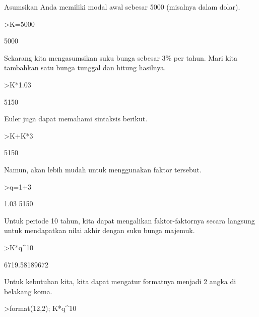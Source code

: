 \documentclass{article}
\newenvironment{eulernotebook}{\par}{\par}
\newenvironment{eulercomment}{\par\medskip}{\par\medskip}
\begin{document}
\begin{eulernotebook}
\begin{eulercomment}
\begin{eulercomment}
\begin{eulercomment}
\begin{eulercomment}
\begin{eulercomment}
\begin{eulercomment}
\begin{eulercomment}
\begin{eulercomment}
\begin{eulercomment}
Asumsikan Anda memiliki modal awal sebesar 5000 (misalnya dalam
dolar).
\end{eulercomment}
\begin{eulerprompt}
>K=5000
\end{eulerprompt}
\begin{euleroutput}
  5000
\end{euleroutput}
\begin{eulercomment}
Sekarang kita mengasumsikan suku bunga sebesar 3\% per tahun. Mari kita
tambahkan satu bunga tunggal dan hitung hasilnya.
\end{eulercomment}
\begin{eulerprompt}
>K*1.03
\end{eulerprompt}
\begin{euleroutput}
  5150
\end{euleroutput}
\begin{eulercomment}
Euler juga dapat memahami sintaksis berikut.
\end{eulercomment}
\begin{eulerprompt}
>K+K*3%
\end{eulerprompt}
\begin{euleroutput}
  5150
\end{euleroutput}
\begin{eulercomment}
Namun, akan lebih mudah untuk menggunakan faktor tersebut.
\end{eulercomment}
\begin{eulerprompt}
>q=1+3%
\end{eulerprompt}
\begin{euleroutput}
  1.03
  5150
\end{euleroutput}
\begin{eulercomment}
Untuk periode 10 tahun, kita dapat mengalikan faktor-faktornya secara
langsung untuk mendapatkan nilai akhir dengan suku bunga majemuk.
\end{eulercomment}
\begin{eulerprompt}
>K*q^10
\end{eulerprompt}
\begin{euleroutput}
  6719.58189672
\end{euleroutput}
\begin{eulercomment}
Untuk kebutuhan kita, kita dapat mengatur formatnya menjadi 2 angka di
belakang koma.
\end{eulercomment}
\begin{eulerprompt}
>format(12,2); K*q^10
\end{eulerprompt}
\begin{euleroutput}

\end{euleroutput}
\end{eulercomment}
\end{eulercomment}
\end{eulercomment}
\end{eulercomment}
\end{eulercomment}
\end{eulercomment}
\end{eulercomment}
\end{eulercomment}
\end{eulernotebook}
\end{document}
